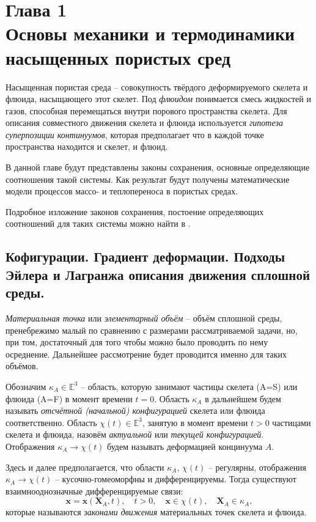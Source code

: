 \section*{Глава 1\\Основы механики и термодинамики насыщенных пористых сред}
\setcounter{section}{1}
\setcounter{subsection}{0}
\setcounter{equation}{0}

	Насыщенная пористая среда -- совокупность твёрдого деформируемого скелета и флюида, насыщающего этот скелет.
	Под \textit{флюидом} понимается смесь жидкостей и газов, способная перемещаться внутри порового пространства скелета.
	Для описания совместного движения скелета и флюида используется \textit{гипотеза суперпозиции континуумов}, которая предполагает что в каждой точке пространства находится и скелет, и флюид. 
	
	В данной главе будут представлены законы сохранения, основные определяющие соотношения такой системы. Как результат будут получены математические модели 	процессов массо- и теплопереноса в пористых средах.
	
	Подробное изложение законов сохранения, постоение определяющих соотношений для таких системы можно найти в \cite{basniev, fortov, kondaurov, checkalyuk}.

\subsection{Кофигурации. Градиент деформации. Подходы Эйлера и Лагранжа описания движения сплошной среды.}
	\textit{Материальная точка} или \textit{элементарный объём} -- объём сплошной среды, пренебрежимо малый по сравнению с размерами рассматриваемой задачи, но, при том,   достаточный для того чтобы можно было проводить по нему осреднение. Дальнейшее рассмотрение будет проводится именно для таких объёмов.
	
	Обозначим $\kappa_A \in \mathbb{E}^3$ -- область, которую занимают частицы скелета (A=S) или флюида (A=F) в момент времени $t=0$. Область $\kappa_A$ в дальнейшем будем называть \textit{отсчётной (начальной) конфигурацией} скелета или флюида соответственно. 
	Область $\chi(t) \in \mathbb{E}^3$, занятую в момент времени $t > 0$ частицами скелета и флюида, назовём \textit{актуальной} или \textit{текущей конфигурацией}. Отображения $\kappa_A \to \chi(t)$ будем называть деформацией концинуума $A$.
	
	Здесь и далее предполагается, что области $\kappa_A$, $\chi(t)$ -- регулярны, отображения $\kappa_A \to \chi(t)$ -- кусочно-гомеоморфны и дифференцируемы. Тогда существуют взаимнооднозначные дифференцируемые связи:
\begin{equation}
	\label{motion_law}
	\mathbf{x} = \mathbf{x}(\mathbf{X}_A, t), \quad t > 0,\quad \mathbf{x} \in \chi(t), \quad \mathbf{X}_A \in \kappa_A,
\end{equation}
	которые называются \textit{законами движения} материальных точек скелета и флюида.
	
